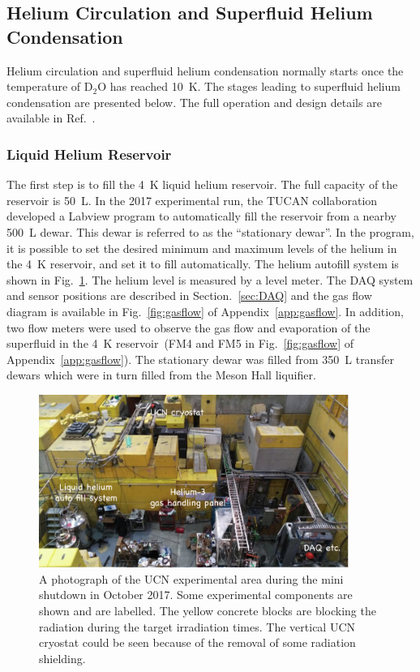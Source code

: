 \subsection{Helium Circulation and Superfluid Helium Condensation}
Helium circulation and superfluid helium condensation normally starts
once the temperature of D$_2$O has reached 10~K. The stages leading to
superfluid helium condensation are presented below. The full operation
and design details are available in Ref.~\cite{matsumiya_thesis}.

\subsubsection{Liquid Helium Reservoir}
The first step is to fill the 4~K liquid helium reservoir. The full
capacity of the reservoir is 50~L. In the 2017 experimental run, the
TUCAN collaboration developed a Labview program to automatically fill
the reservoir from a nearby 500~L dewar. This dewar is referred to as
the ``stationary dewar''. In the program, it is possible to set the
desired minimum and maximum levels of the helium in the 4~K reservoir,
and set it to fill automatically. The helium autofill system is shown
in Fig.~\ref{fig:ucnarea}. The helium level is measured by a level
meter. The DAQ system and sensor positions are described in
Section.~\ref{sec:DAQ} and the gas flow diagram is available in
Fig.~\ref{fig:gasflow} of Appendix~\ref{app:gasflow}. In addition, two
flow meters were used to observe the gas flow and evaporation of the
superfluid in the 4~K reservoir~(FM4 and FM5 in Fig.~\ref{fig:gasflow}
of Appendix~\ref{app:gasflow}). The stationary dewar was filled from
350~L transfer dewars which were in turn filled from the Meson Hall
liquifier.

\begin{figure}[h!]
  \centering
  \includegraphics[width=0.9\textwidth]{ucnarea.png}
  \caption[UCN experimental area during the mini shutdown in October
  2017]{A photograph of the UCN experimental area during the mini
    shutdown in October 2017. Some experimental components are shown
    and are labelled. The yellow concrete blocks are blocking the
    radiation during the target irradiation times. The vertical UCN
    cryostat could be seen because of the removal of some radiation
    shielding. }
  \label{fig:ucnarea}
\end{figure}

